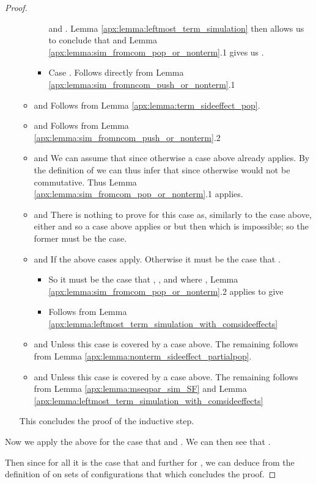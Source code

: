 \begin{proof}
\begin{itemize}
\begin{itemize}
\begin{itemize}
					and
					.
					Lemma \ref{apx:lemma:leftmost_term_simulation} then allows us to conclude that
					 and
				    Lemma \ref{apx:lemma:sim_fromcom_pop_or_nonterm}.1 gives us
				    .
			\item Case .\newline
				Follows directly from Lemma \ref{apx:lemma:sim_fromncom_push_or_nonterm}.1
		\end{itemize}
		\item  and  \newline
		Follows from Lemma \ref{apx:lemma:term_sideeffect_pop}.
		\item  and  \newline
		Follows from Lemma \ref{apx:lemma:sim_fromncom_push_or_nonterm}.2
		\item  and \newline
		We can assume that  since otherwise a case above already applies.
		By the definition of  we can thus infer that  since otherwise 
		 would not be commutative.
		Thus Lemma \ref{apx:lemma:sim_fromcom_pop_or_nonterm}.1 applies.
		\item  and \newline
		There is nothing to prove for this case as, similarly to the case above, either  and so a case above applies or  but then  which is impossible; so the former must be the case.
		\item  and \newline
			If  the above cases apply. Otherwise it must be the case that .
			\begin{itemize}
				\item  \newline
				So it must be the case that
				, ,   and  where 
				, 
				Lemma \ref{apx:lemma:sim_fromcom_pop_or_nonterm}.2 applies to give
				

				\item \newline
				Follows from Lemma \ref{apx:lemma:leftmost_term_simulation_with_comsideeffects}
			\end{itemize}
		\item  and \newline
			Unless  this case is covered by a case above.
			The remaining follows from Lemma \ref{apx:lemma:nonterm_sideeffect_partialpop}.
		\item  and \newline
			Unless  this case is covered by a case above.
			The remaining follows from Lemma \ref{apx:lemma:mseqpar_sim_SF} and Lemma \ref{apx:lemma:leftmost_term_simulation_with_comsideeffects}
	\end{itemize}
	This concludes the proof of the inductive step.
\end{itemize}
Now we apply the above for the case that
 and .
We can then see that .

Then since for all  it is the case that 
 and further for 
, 
 we can deduce from the definition of \toCM on sets of configurations that
 which concludes the proof.
\end{proof}